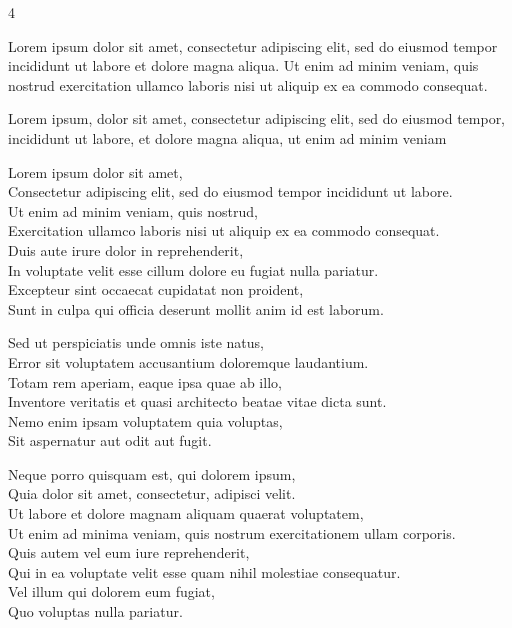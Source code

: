 \documentclass[a4paper,landscape]{memoir}
\begin{document}
\pagestyle{empty}
\begin{multicols*}{4}

\begin{notes}
Lorem ipsum dolor sit amet, consectetur adipiscing elit, sed do eiusmod tempor incididunt ut labore et dolore magna aliqua. Ut enim ad minim veniam, quis nostrud exercitation ullamco laboris nisi ut aliquip ex ea commodo consequat.
\end{notes}
\begin{style}
Lorem ipsum, dolor sit amet, consectetur adipiscing elit, sed do eiusmod tempor, incididunt ut labore, et dolore magna aliqua, ut enim ad minim veniam
\end{style}
\begin{lyrics}
Lorem ipsum dolor sit amet,\\
Consectetur adipiscing elit, sed do eiusmod tempor incididunt ut labore.\\
Ut enim ad minim veniam, quis nostrud,\\
Exercitation ullamco laboris nisi ut aliquip ex ea commodo consequat.\\
Duis aute irure dolor in reprehenderit,\\
In voluptate velit esse cillum dolore eu fugiat nulla pariatur.\\
Excepteur sint occaecat cupidatat non proident,\\
Sunt in culpa qui officia deserunt mollit anim id est laborum.

Sed ut perspiciatis unde omnis iste natus,\\
Error sit voluptatem accusantium doloremque laudantium.\\
Totam rem aperiam, eaque ipsa quae ab illo,\\
Inventore veritatis et quasi architecto beatae vitae dicta sunt.\\
Nemo enim ipsam voluptatem quia voluptas,\\
Sit aspernatur aut odit aut fugit.

Neque porro quisquam est, qui dolorem ipsum,\\
Quia dolor sit amet, consectetur, adipisci velit.\\
Ut labore et dolore magnam aliquam quaerat voluptatem,\\
Ut enim ad minima veniam, quis nostrum exercitationem ullam corporis.\\
Quis autem vel eum iure reprehenderit,\\
Qui in ea voluptate velit esse quam nihil molestiae consequatur.\\
Vel illum qui dolorem eum fugiat,\\
Quo voluptas nulla pariatur.


\end{lyrics}
\end{multicols*}
\end{document}
